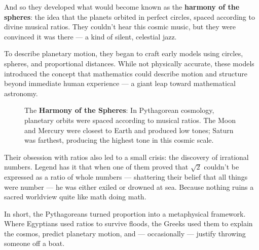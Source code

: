 And so they developed what would become known as the \textbf{harmony of the spheres}: the idea that the planets orbited in perfect circles, spaced according to divine musical ratios. They couldn't hear this cosmic music, but they were convinced it was there — a kind of silent, celestial jazz.

To describe planetary motion, they began to craft early models using circles, spheres, and proportional distances. While not physically accurate, these models introduced the concept that mathematics could describe motion and structure beyond immediate human experience — a giant leap toward mathematical astronomy.

\begin{figure}[H]
   \centering
   \caption{The \textbf{Harmony of the Spheres}: In Pythagorean cosmology, planetary orbits were spaced according to musical ratios. The Moon and Mercury were closest to Earth and produced low tones; Saturn was farthest, producing the highest tone in this cosmic scale.}
\end{figure}

\medskip


Their obsession with ratios also led to a small crisis: the discovery of irrational numbers. Legend has it that when one of them proved that \(\sqrt{2}\) couldn’t be expressed as a ratio of whole numbers — shattering their belief that all things were number — he was either exiled or drowned at sea. Because nothing ruins a sacred worldview quite like math doing math.

In short, the Pythagoreans turned proportion into a metaphysical framework. Where Egyptians used ratios to survive floods, the Greeks used them to explain the cosmos, predict planetary motion, and — occasionally — justify throwing someone off a boat.
